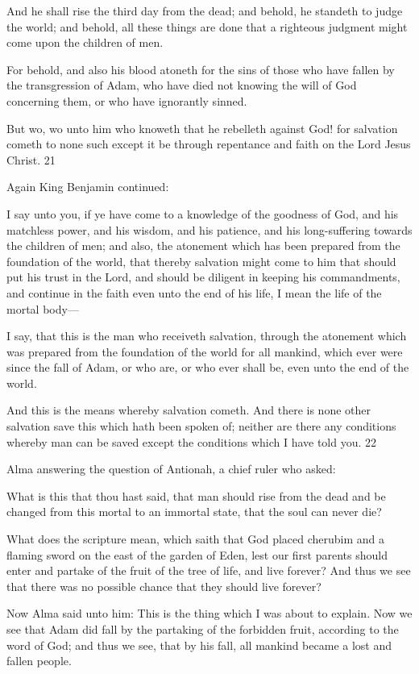 And he shall rise the third day from the dead; and behold, he standeth to judge the world; and
behold, all these things are done that a righteous judgment might come upon the children of
men.

For behold, and also his blood atoneth for the sins of those who have fallen by the
transgression of Adam, who have died not knowing the will of God concerning them, or who
have ignorantly sinned.

But wo, wo unto him who knoweth that he rebelleth against God! for salvation cometh to
none such except it be through repentance and faith on the Lord Jesus Christ. 21

Again King Benjamin continued:

I say unto you, if ye have come to a knowledge of the goodness of God, and his matchless
power, and his wisdom, and his patience, and his long-suffering towards the children of men;
and also, the atonement which has been prepared from the foundation of the world, that
thereby salvation might come to him that should put his trust in the Lord, and should be
diligent in keeping his commandments, and continue in the faith even unto the end of his life,
I mean the life of the mortal body—

I say, that this is the man who receiveth salvation, through the atonement which was prepared
from the foundation of the world for all mankind, which ever were since the fall of Adam, or
who are, or who ever shall be, even unto the end of the world.

And this is the means whereby salvation cometh. And there is none other salvation save this
which hath been spoken of; neither are there any conditions whereby man can be saved
except the conditions which I have told you. 22

Alma answering the question of Antionah, a chief ruler who asked:

What is this that thou hast said, that man should rise from the dead and be changed from this
mortal to an immortal state, that the soul can never die?

What does the scripture mean, which saith that God placed cherubim and a flaming sword on
the east of the garden of Eden, lest our first parents should enter and partake of the fruit of
the tree of life, and live forever? And thus we see that there was no possible chance that they
should live forever?

Now Alma said unto him: This is the thing which I was about to explain. Now we see that
Adam did fall by the partaking of the forbidden fruit, according to the word of God; and thus
we see, that by his fall, all mankind became a lost and fallen people.

